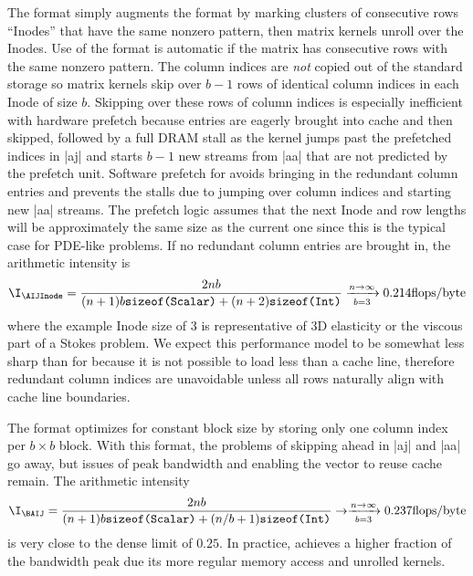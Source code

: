 The {\AIJInode} format simply augments the {\AIJ} format by marking clusters of consecutive rows ``Inodes'' that have the same nonzero pattern, then matrix kernels unroll over the Inodes.
Use of the {\AIJInode} format is automatic if the matrix has consecutive rows with the same nonzero pattern.
The column indices are \emph{not} copied out of the standard {\AIJ} storage so matrix kernels skip over $b-1$ rows of identical column indices in each Inode of size $b$.
Skipping over these rows of column indices is especially inefficient with hardware prefetch because entries are eagerly brought into cache and then skipped, followed by a full DRAM stall as the kernel jumps past the prefetched indices in \cverb|aj| and starts $b-1$ new streams from \cverb|aa| that are not predicted by the prefetch unit.
Software prefetch for {\AIJInode} avoids bringing in the redundant column entries and prevents the stalls due to jumping over column indices and starting new \cverb|aa| streams.
The prefetch logic assumes that the next Inode and row lengths will be approximately the same size as the current one since this is the typical case for PDE-like problems.
If no redundant column entries are brought in, the arithmetic intensity is
\begin{align*}
  \I_{{\AIJInode}} = \frac{2nb}{(n+1)b\texttt{sizeof(Scalar)} + (n+2)\texttt{sizeof(Int)}} \xrightarrow[b=3]{n\to\infty} 0.214 \text{flops/byte}
\end{align*}
where the example Inode size of 3 is representative of 3D elasticity or the viscous part of a Stokes problem.
We expect this performance model to be somewhat less sharp than for {\AIJ} because it is not possible to load less than a cache line, therefore redundant column indices are unavoidable unless all rows naturally align with cache line boundaries.

The {\BAIJ} format optimizes for constant block size by storing only one column index per $b\times b$ block.
With this format, the problems of skipping ahead in \cverb|aj| and \cverb|aa| go away, but issues of peak bandwidth and enabling the vector to reuse cache remain.
The arithmetic intensity
\begin{align*}
  \I_{{\BAIJ}} = \frac{2nb}{(n+1)b\texttt{sizeof(Scalar)} + (n/b+1)\texttt{sizeof(Int)}} \to \xrightarrow[b=3]{n\to\infty} 0.237 \text{flops/byte}
\end{align*}
is very close to the dense limit of $0.25$.
In practice, {\BAIJ} achieves a higher fraction of the bandwidth peak due its more regular memory access and unrolled kernels.

